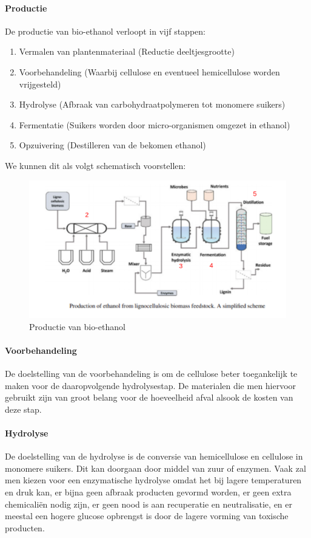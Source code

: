 \documentclass[a4paper,kul]{kulakarticle} %
\begin{document}
\paragraph{Productie}
De productie van bio-ethanol verloopt in vijf stappen:
\begin{enumerate}
	\item Vermalen van plantenmateriaal (Reductie deeltjesgrootte)
	\item Voorbehandeling (Waarbij cellulose en eventueel hemicellulose worden vrijgesteld)
	\item Hydrolyse (Afbraak van carbohydraatpolymeren tot monomere suikers)
	\item Fermentatie (Suikers worden door micro-organismen omgezet in ethanol)
	\item Opzuivering (Destilleren van de bekomen ethanol)
\end{enumerate}
We kunnen dit als volgt schematisch voorstellen:
\begin{figure}[h]
	\centering
	\includegraphics[width=0.7\linewidth]{EthanolProductie}
	\caption[Ethanol productie]{Productie van bio-ethanol}
	\label{fig:ethanolproductie}
\end{figure}
\paragraph{Voorbehandeling}
De doelstelling van de voorbehandeling is om de cellulose beter toegankelijk te maken voor de daaropvolgende hydrolysestap. De materialen die men hiervoor gebruikt zijn van groot belang voor de hoeveelheid afval alsook de kosten van deze stap.
\paragraph{Hydrolyse}
De doelstelling van de hydrolyse is de conversie van hemicellulose en cellulose in monomere suikers. Dit kan doorgaan door middel van zuur of enzymen. Vaak zal men kiezen voor een enzymatische hydrolyse omdat het bij lagere temperaturen en druk kan, er bijna geen afbraak producten gevormd worden, er geen extra chemicaliën nodig zijn, er geen nood is aan recuperatie en neutralisatie, en er meestal een hogere glucose opbrengst is door de lagere vorming van toxische producten. 
\end{document}
